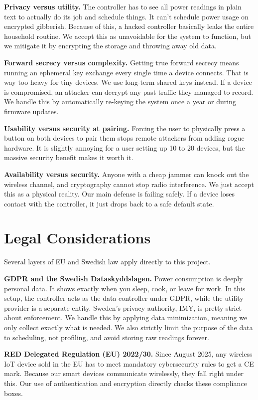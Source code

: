 \documentclass[a4paper,11pt]{article}
\begin{document}
\textbf{Privacy versus utility.} The controller has to see all power readings in plain text to actually do its job and schedule things. It can't schedule power usage on encrypted gibberish. Because of this, a hacked controller basically leaks the entire household routine. We accept this as unavoidable for the system to function, but we mitigate it by encrypting the storage and throwing away old data.

\textbf{Forward secrecy versus complexity.} Getting true forward secrecy means running an ephemeral key exchange every single time a device connects. That is way too heavy for tiny devices. We use long-term shared keys instead. If a device is compromised, an attacker can decrypt any past traffic they managed to record. We handle this by automatically re-keying the system once a year or during firmware updates.

\textbf{Usability versus security at pairing.} Forcing the user to physically press a button on both devices to pair them stops remote attackers from adding rogue hardware. It is slightly annoying for a user setting up 10 to 20 devices, but the massive security benefit makes it worth it.

\textbf{Availability versus security.} Anyone with a cheap jammer can knock out the wireless channel, and cryptography cannot stop radio interference. We just accept this as a physical reality. Our main defense is failing safely. If a device loses contact with the controller, it just drops back to a safe default state.

\section{Legal Considerations}

Several layers of EU and Swedish law apply directly to this project.

\textbf{GDPR and the Swedish Dataskyddslagen.} Power consumption is deeply personal data. It shows exactly when you sleep, cook, or leave for work. In this setup, the controller acts as the data controller under GDPR, while the utility provider is a separate entity. Sweden's privacy authority, IMY, is pretty strict about enforcement. We handle this by applying data minimization, meaning we only collect exactly what is needed. We also strictly limit the purpose of the data to scheduling, not profiling, and avoid storing raw readings forever.

\textbf{RED Delegated Regulation (EU) 2022/30.} Since August 2025, any wireless IoT device sold in the EU has to meet mandatory cybersecurity rules to get a CE mark. Because our smart devices communicate wirelessly, they fall right under this. Our use of authentication and encryption directly checks these compliance boxes.
\end{document}
